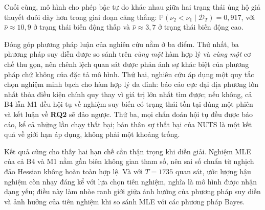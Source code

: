 \documentclass[12pt,a4paper]{article}
\numberwithin{equation}{section}
\newcommand{\Data}{\mathcal{D}}
\newcommand{\Prob}{\mathbb{P}}
\newcommand{\RQ}[1]{\textbf{RQ#1}}
\begin{document}
Cuối cùng, mô hình cho phép bậc tự do khác nhau giữa hai trạng thái ủng hộ giả thuyết đuôi dày hơn trong giai đoạn căng thẳng: $\Prob(\nu_2<\nu_1\mid\Data_T)=0{,}917$, với $\hat\nu\approx10{,}9$ ở trạng thái biến động thấp và $\hat\nu\approx3{,}7$ ở trạng thái biến động cao.

Đóng góp phương pháp luận của nghiên cứu nằm ở ba điểm. Thứ nhất, ba phương pháp suy diễn được so sánh trên \emph{cùng một} hàm hợp lý và \emph{cùng một} cơ chế thu gọn, nên chênh lệch quan sát được phản ánh sự khác biệt của phương pháp chứ không của đặc tả mô hình. Thứ hai, nghiên cứu áp dụng một quy tắc chọn nghiệm minh bạch cho hàm hợp lý đa đỉnh: báo cáo cực đại địa phương lớn nhất thỏa điều kiện chính quy thay vì giá trị lớn nhất tìm được; nếu không, cả B4 lẫn M1 đều hội tụ về nghiệm suy biến có trạng thái tồn tại đúng một phiên và kết luận về \RQ{2} sẽ đảo ngược. Thứ ba, mọi chẩn đoán hội tụ đều được báo cáo, kể cả những lần chạy thất bại; bản thân sự thất bại của NUTS là một kết quả về giới hạn áp dụng, không phải một khoảng trống.

Kết quả cũng cho thấy hai hạn chế cần thận trọng khi diễn giải. Nghiệm MLE của cả B4 và M1 nằm gần biên không gian tham số, nên sai số chuẩn từ nghịch đảo Hessian không hoàn toàn hợp lệ. Và với $T=1735$ quan sát, ước lượng hậu nghiệm còn nhạy đáng kể với lựa chọn tiên nghiệm, nghĩa là mô hình được nhận dạng yếu; điều này làm nhòe ranh giới giữa ảnh hưởng của phương pháp suy diễn và ảnh hưởng của tiên nghiệm khi so sánh MLE với các phương pháp Bayes.
\end{document}
